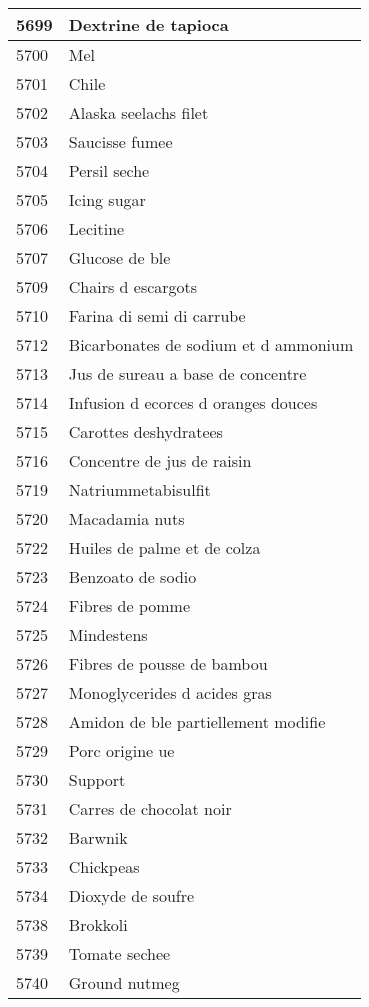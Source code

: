 \begin{longtable}{|l|l|}
5699 & Dextrine de tapioca \\ \hline 
5700 & Mel \\ \hline 
5701 & Chile \\ \hline 
5702 & Alaska seelachs filet \\ \hline 
5703 & Saucisse fumee \\ \hline 
5704 & Persil seche \\ \hline 
5705 & Icing sugar \\ \hline 
5706 & Lecitine \\ \hline 
5707 & Glucose de ble \\ \hline 
5709 & Chairs d escargots \\ \hline 
5710 & Farina di semi di carrube \\ \hline 
5712 & Bicarbonates de sodium et d ammonium \\ \hline 
5713 & Jus de sureau a base de concentre \\ \hline 
5714 & Infusion d ecorces d oranges douces \\ \hline 
5715 & Carottes deshydratees \\ \hline 
5716 & Concentre de jus de raisin \\ \hline 
5719 & Natriummetabisulfit \\ \hline 
5720 & Macadamia nuts \\ \hline 
5722 & Huiles de palme et de colza \\ \hline 
5723 & Benzoato de sodio \\ \hline 
5724 & Fibres de pomme \\ \hline 
5725 & Mindestens \\ \hline 
5726 & Fibres de pousse de bambou \\ \hline 
5727 & Monoglycerides d acides gras \\ \hline 
5728 & Amidon de ble partiellement modifie \\ \hline 
5729 & Porc origine ue \\ \hline 
5730 & Support \\ \hline 
5731 & Carres de chocolat noir \\ \hline 
5732 & Barwnik \\ \hline 
5733 & Chickpeas \\ \hline 
5734 & Dioxyde de soufre \\ \hline 
5738 & Brokkoli \\ \hline 
5739 & Tomate sechee \\ \hline 
5740 & Ground nutmeg \\ \hline 

\end{longtable}
